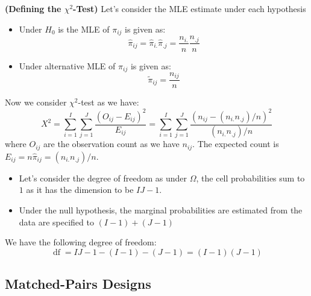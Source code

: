 \begin{remark}{\textbf{(Defining the $\chi^2$-Test)}}
    Let's consider the MLE estimate under each hypothesis 
    \begin{itemize}
        \item Under $H_0$ is the MLE of $\pi_{ij}$ is given as:
        \begin{equation*}
            \hat{\pi}_{ij} = \hat{\pi}_{i.}\hat{\pi}_{.j} = \frac{n_{i.}}{n}\frac{n_{.j}}{n}
        \end{equation*}
        \item Under alternative MLE of $\pi_{ij}$ is given as:
        \begin{equation*}
            \tilde{\pi}_{ij} = \frac{n_{ij}}{n}
        \end{equation*}
    \end{itemize}
    Now we consider $\chi^2$-test as we have:
    \begin{equation*}
        X^2 = \sum^I_{i=1}\sum^J_{j=1} \frac{(O_{ij} - E_{ij})^2}{E_{ij}} = \sum^I_{i=1}\sum^J_{j=1} \frac{(n_{ij} -  (n_{i.}n_{.j})/n)^2}{ (n_{i.}n_{.j})/n}
    \end{equation*}
    where $O_{ij}$ are the observation count as we have $n_{ij}$. The expected count is $E_{ij} = n\hat{\pi}_{ij} = (n_{i.}n_{.j})/n$. 
    \begin{itemize}
        \item Let's consider the degree of freedom as under $\Omega$, the cell probabilities sum to $1$ as it has the dimension to be $IJ-1$. 
        \item Under the null hypothesis, the marginal probabilities are estimated from the data are specified to $(I-1)+(J-1)$
    \end{itemize}
    We have the following degree of freedom: 
    \begin{equation*}
        \operatorname{df} = IJ - 1 - (I-1) - (J-1) = (I-1)(J-1)
    \end{equation*}
\end{remark}

\subsection{Matched-Pairs Designs}

